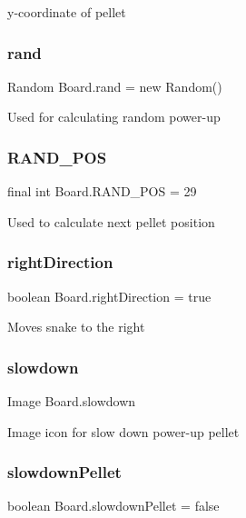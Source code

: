 y-\/coordinate of pellet \mbox{\label{class_board_a437c36e144698e50f2a842d4b60979e3}} 
\subsubsection{\texorpdfstring{rand}{rand}}
{\footnotesize\ttfamily Random Board.\+rand = new Random()}

Used for calculating random power-\/up \mbox{\label{class_board_a7e683d47d45e3734833860cda1993366}} 
\subsubsection{\texorpdfstring{R\+A\+N\+D\+\_\+\+P\+OS}{RAND\_POS}}
{\footnotesize\ttfamily final int Board.\+R\+A\+N\+D\+\_\+\+P\+OS = 29}

Used to calculate next pellet position \mbox{\label{class_board_a07dcadb0e102900ec4110e679e6e10f1}} 
\subsubsection{\texorpdfstring{right\+Direction}{rightDirection}}
{\footnotesize\ttfamily boolean Board.\+right\+Direction = true}

Moves snake to the right \mbox{\label{class_board_ac831f1556734f69a7d70fe4e8725079c}} 
\subsubsection{\texorpdfstring{slowdown}{slowdown}}
{\footnotesize\ttfamily Image Board.\+slowdown}

Image icon for slow down power-\/up pellet \mbox{\label{class_board_a79cef3a39a5160aa365ab9e37a768850}} 
\subsubsection{\texorpdfstring{slowdown\+Pellet}{slowdownPellet}}
{\footnotesize\ttfamily boolean Board.\+slowdown\+Pellet = false}

